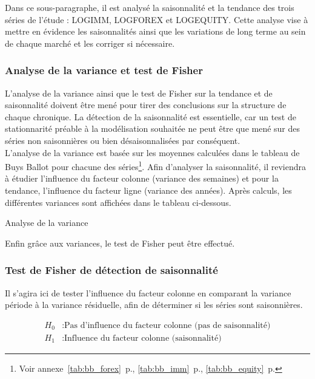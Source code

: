 Dans ce sous-paragraphe, il est analysé la saisonnalité et la tendance des trois séries de l'étude : LOGIMM, LOGFOREX et LOGEQUITY. Cette analyse vise à mettre en évidence les saisonnalités ainsi que les variations de long terme au sein de chaque marché et les corriger si nécessaire.

\subsubsection*{Analyse de la variance et test de Fisher}

L'analyse de la variance ainsi que le test de Fisher sur la tendance et de saisonnalité doivent être mené pour tirer des conclusions sur la structure de chaque chronique. La détection de la saisonnalité est essentielle, car un test de stationnarité préable à la modélisation souhaitée ne peut être que mené sur des séries non saisonnières ou bien désaisonnalisées par conséquent.\\

L'analyse de la variance est basée sur les moyennes calculées dans le tableau de Buys Ballot pour chacune des séries\footnote{Voir annexe~\autoref{tab:bb_forex}~p.\pageref{tab:bb_forex}, \autoref{tab:bb_imm}~p.\pageref{tab:bb_imm}, \autoref{tab:bb_equity}~p.\pageref{tab:bb_equity}}. Afin d'analyser la saisonnalité, il reviendra à étudier l'influence du facteur colonne (variance des semaines) et pour la tendance, l'influence du facteur ligne (variance des années). Après calculs, les différentes variances sont affichées dans le tableau ci-dessous.

\begin{table}[H]
    \centering
    \caption{Analyse de la variance}
    \sffamily
    
\end{table}

Enfin grâce aux variances, le test de Fisher peut être effectué.

\subsubsection*{Test de Fisher de détection de saisonnalité}

Il s'agira ici de tester l'influence du facteur colonne en comparant la variance période à la variance résiduelle, afin de déterminer si les séries sont saisonnières.

\begin{equation*}
    \begin{split}
        H_{0} &: \text{Pas d'influence du facteur colonne (pas de saisonnalité)} \\
        H_{1} &: \text{Influence du facteur colonne (saisonnalité)}
    \end{split}
\end{equation*}

